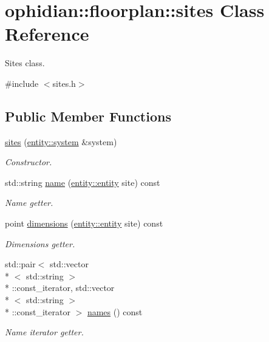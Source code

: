 \hypertarget{classophidian_1_1floorplan_1_1sites}{\section{ophidian\-:\-:floorplan\-:\-:sites Class Reference}
\label{classophidian_1_1floorplan_1_1sites}
}


Sites class.  




{\ttfamily \#include $<$sites.\-h$>$}

\subsection*{Public Member Functions}
\begin{DoxyCompactItemize}
\item 
\hyperlink{classophidian_1_1floorplan_1_1sites_a448e8d956831330bad88f3bc41ad3897}{sites} (\hyperlink{classophidian_1_1entity_1_1system}{entity\-::system} \&system)
\begin{DoxyCompactList}\small\item\em Constructor. \end{DoxyCompactList}\item 
std\-::string \hyperlink{classophidian_1_1floorplan_1_1sites_aedaadf66a689a9542f3c33da9f76cfd4}{name} (\hyperlink{classophidian_1_1entity_1_1entity}{entity\-::entity} site) const 
\begin{DoxyCompactList}\small\item\em Name getter. \end{DoxyCompactList}\item 
point \hyperlink{classophidian_1_1floorplan_1_1sites_addce4102309e4f3f07e9869ced4bfbc6}{dimensions} (\hyperlink{classophidian_1_1entity_1_1entity}{entity\-::entity} site) const 
\begin{DoxyCompactList}\small\item\em Dimensions getter. \end{DoxyCompactList}\item 
std\-::pair$<$ std\-::vector\\*
$<$ std\-::string $>$\\*
\-::const\-\_\-iterator, std\-::vector\\*
$<$ std\-::string $>$\\*
\-::const\-\_\-iterator $>$ \hyperlink{classophidian_1_1floorplan_1_1sites_abcd874e49de890637581e8b192274b5e}{names} () const 
\begin{DoxyCompactList}\small\item\em Name iterator getter. \end{DoxyCompactList}\item 

\end{DoxyCompactItemize}
